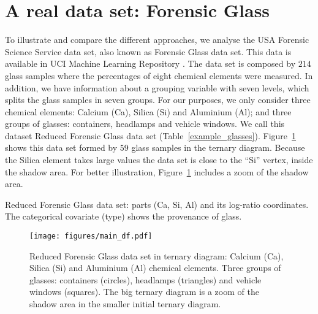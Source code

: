 \documentclass[12pt, a4paper]{article}
\begin{document}
\section{A real data set: Forensic Glass}
\label{example_section}

\noindent To illustrate and compare the different approaches, we analyse the USA Forensic Science Service data set, also known as Forensic Glass data set. This data is available in UCI Machine Learning Repository \citep{uci2007repository}.  The data set is composed by  $214$ glass samples where the percentages of eight chemical elements were measured. In addition, we have information about a grouping variable with seven levels, which splits the glass samples in seven groups. For our purposes, we only consider three chemical elements: Calcium (Ca), Silica (Si) and Aluminium (Al); and three groups of glasses: containers, headlamps and vehicle windows. We call this dataset Reduced Forensic Glass data set (Table~\ref{example_glasses}). Figure~\ref{fig04} shows this data set formed by $59$ glass samples in the ternary diagram. Because the Silica element takes large values the data set is close to the  ``Si'' vertex, inside the shadow area. For better illustration, Figure~\ref{fig04} includes a zoom of the shadow area.


\begin{table}
\centering
\scriptsize


%
\caption{Reduced Forensic Glass data set: parts (Ca, Si, Al) and its log-ratio coordinates. 
The categorical covariate  (type) shows the provenance of glass.}
\label{example_glasses}
\end{table}

% 
% 

\begin{figure}[htbp]
\centering
\texttt{[image: figures/main\_df.pdf]}%
\caption{Reduced Forensic Glass data set in ternary diagram: Calcium (Ca), Silica (Si) and Aluminium (Al) chemical elements. Three groups of glasses: containers (circles), headlamps (triangles) and vehicle windows (squares). The big ternary diagram is a zoom of the shadow area in the smaller initial ternary diagram.}
\label{fig04}
\end{figure}
\end{document}
